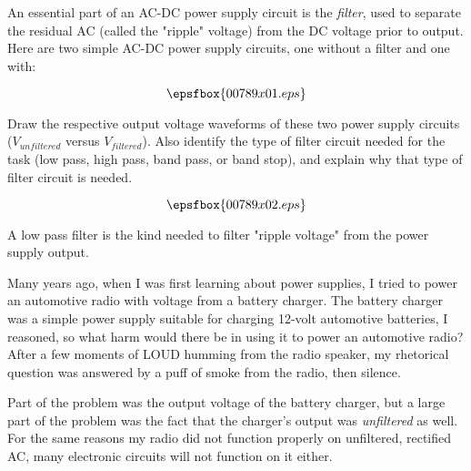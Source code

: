 

An essential part of an AC-DC power supply circuit is the {\it filter}, used to separate the residual AC (called the "ripple" voltage) from the DC voltage prior to output.  Here are two simple AC-DC power supply circuits, one without a filter and one with:

$$\epsfbox{00789x01.eps}$$

Draw the respective output voltage waveforms of these two power supply circuits ($V_{unfiltered}$ versus $V_{filtered}$).  Also identify the type of filter circuit needed for the task (low pass, high pass, band pass, or band stop), and explain why that type of filter circuit is needed.







$$\epsfbox{00789x02.eps}$$

A low pass filter is the kind needed to filter "ripple voltage" from the power supply output.







Many years ago, when I was first learning about power supplies, I tried to power an automotive radio with voltage from a battery charger.  The battery charger was a simple power supply suitable for charging 12-volt automotive batteries, I reasoned, so what harm would there be in using it to power an automotive radio?  After a few moments of LOUD humming from the radio speaker, my rhetorical question was answered by a puff of smoke from the radio, then silence.

Part of the problem was the output voltage of the battery charger, but a large part of the problem was the fact that the charger's output was {\it unfiltered} as well.  For the same reasons my radio did not function properly on unfiltered, rectified AC, many electronic circuits will not function on it either.




